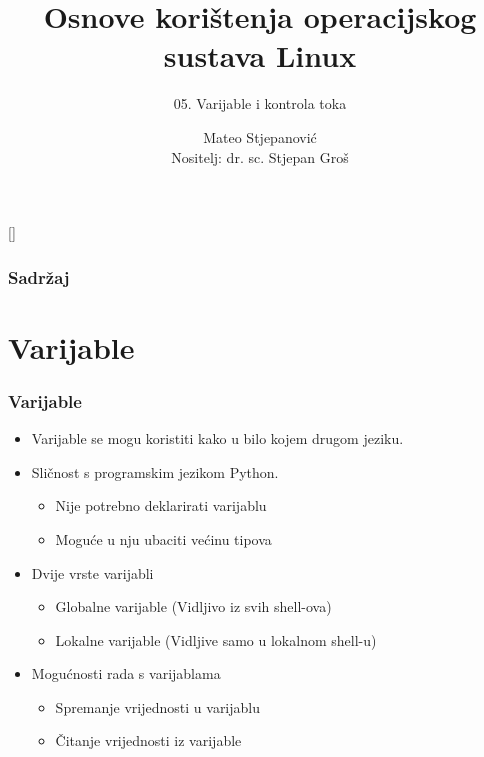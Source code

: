 \documentclass{beamer}
\title{Osnove korištenja operacijskog sustava Linux}
\subtitle{05. Varijable i kontrola toka}
\author[Mateo Stjepanović]{Mateo Stjepanović\\{\small Nositelj: dr. sc. Stjepan Groš}}
\institute[FER]{Sveučilište u Zagrebu \\
				Fakultet elektrotehnike i računarstva}
\date{\todayiso}
\begin{document}
{
[] %

\begin{frame}
\maketitle
\end{frame}
}

\begin{frame}
\frametitle{Sadržaj}
\tableofcontents
\end{frame}

\section{Varijable}
\begin{frame}[t]
\frametitle{Varijable}
\begin{itemize}
  \item Varijable se mogu koristiti kako u bilo kojem drugom jeziku.
  \item Sličnost s programskim jezikom Python.
  	\begin{itemize}
  		\item Nije potrebno deklarirati varijablu
  		\item Moguće u nju ubaciti većinu tipova
  	\end{itemize}
  \item Dvije vrste varijabli
  	\begin{itemize}
  		\item Globalne varijable (Vidljivo iz svih shell-ova)
  		\item Lokalne varijable (Vidljive samo u lokalnom shell-u)
  	\end{itemize}
  
  \item Mogućnosti rada s varijablama
  	\begin{itemize}
		\item Spremanje vrijednosti u varijablu
		\item Čitanje vrijednosti iz varijable
  	\end{itemize}
\end{itemize}
\end{frame}
\end{document}
